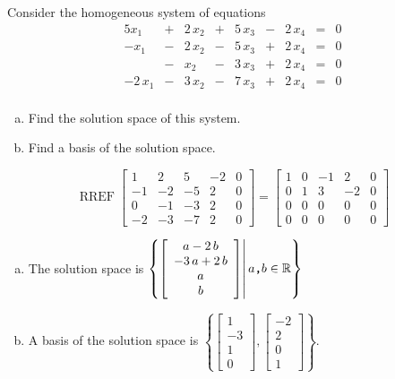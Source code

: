 
\begin{exerciseStatement}


Consider the homogeneous system of equations 
\begin{alignat*}{5} x_{1} &+& 2 \, x_{2} &+& 5 \, x_{3} &-& 2 \, x_{4} &=& 0 \\-x_{1} &-& 2 \, x_{2} &-& 5 \, x_{3} &+& 2 \, x_{4} &=& 0 \\ &-& x_{2} &-& 3 \, x_{3} &+& 2 \, x_{4} &=& 0 \\-2 \, x_{1} &-& 3 \, x_{2} &-& 7 \, x_{3} &+& 2 \, x_{4} &=& 0 \\ \end{alignat*}
            


\begin{enumerate}[(a)]
\item  Find the solution space of this system.
\item  Find a basis of the solution space.
\end{enumerate}
    
\end{exerciseStatement}
    
\begin{exerciseAnswer} 


\[\operatorname{RREF} \left[\begin{array}{cccc|c}
1 & 2 & 5 & -2 & 0 \\
-1 & -2 & -5 & 2 & 0 \\
0 & -1 & -3 & 2 & 0 \\
-2 & -3 & -7 & 2 & 0
\end{array}\right] = \left[\begin{array}{cccc|c}
1 & 0 & -1 & 2 & 0 \\
0 & 1 & 3 & -2 & 0 \\
0 & 0 & 0 & 0 & 0 \\
0 & 0 & 0 & 0 & 0
\end{array}\right] \]


\begin{enumerate}[(a)]
\item The solution space is \( \left\{ \left[\begin{array}{c}
a - 2 \, b \\
-3 \, a + 2 \, b \\
a \\
b
\end{array}\right] \middle|\,a\text{\texttt{,}}b\in\mathbb{R}\right\} \)
\item A basis of the solution space is \( \left\{ \left[\begin{array}{c}
1 \\
-3 \\
1 \\
0
\end{array}\right] , \left[\begin{array}{c}
-2 \\
2 \\
0 \\
1
\end{array}\right] \right\} \).
\end{enumerate}
    
\end{exerciseAnswer}
    
